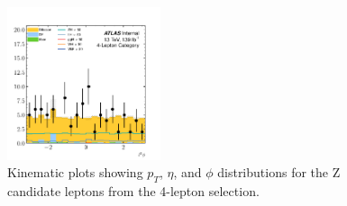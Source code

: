 \begin{figure}[htpb]
  \includegraphics[width=0.4\textwidth]{figures/hmm/kinematics/histo-4lep-aux2_phi.pdf}
  \caption{Kinematic plots showing $p_T$, $\eta$, and $\phi$ distributions for the Z candidate leptons from the 4-lepton selection.}
    \label{fig:hmmKineZhLeps}
\end{figure}
\clearpage



